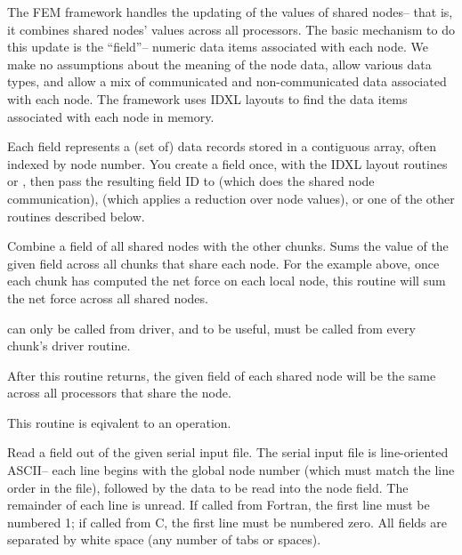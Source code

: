 \documentclass[10pt]{article}
\begin{document}
The FEM framework handles the updating of the values of shared nodes-- that
is, it combines shared nodes' values across all processors.  The basic
mechanism to do this update is the ``field''-- numeric data items associated
with each node. We make no assumptions about the meaning of the node data,
allow various data types, and allow a mix of communicated and non-communicated 
data associated with each node.  The framework uses IDXL layouts to find the data items
associated with each node in memory.

Each field represents a (set of) data records stored in a contiguous array,
often indexed by node number.  You create a field once, with the IDXL layout 
routines or ,
then pass the resulting field ID to  (which does the
shared node communication),  (which applies a
reduction over node values), or one of the other routines described below.



     Combine a field of all shared nodes with the other chunks.  Sums
     the value of the given field across all chunks that share each
     node.  For the example above, once each chunk has computed the net
     force on each local node, this routine will sum the net force
     across all shared nodes.

      can only be called from driver, and to be useful,
     must be called from every chunk's driver routine.

     After this routine returns, the given field of each shared node
     will be the same across all processors that share the node.
     
     This routine is eqivalent to an  operation.


     Read a field out of the given serial input file.  The serial input
     file is line-oriented ASCII-- each line begins with the global
     node number (which must match the line order in the file),
     followed by the data to be read into the node field.  The
     remainder of each line is unread.  If called from Fortran, the
     first line must be numbered 1; if called from C, the first line
     must be numbered zero.  All fields are separated by white space
     (any number of tabs or spaces).
\end{document}
